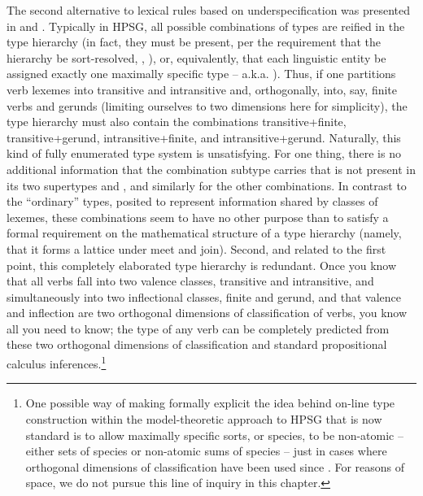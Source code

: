 \documentclass[output=paper]{langsci/langscibook}
\begin{document}
The second alternative to lexical rules based on underspecification was presented in  and . Typically in HPSG, all possible combinations of types are reified in the type hierarchy (in fact, they must be present, per the requirement that the hierarchy be sort-resolved, \citealt{Carpenter1992}, \citealt{PollardandSag1994}), or, equivalently, that each linguistic entity be assigned exactly one maximally specific type -- a.k.a.  \citet[78]{Richter2000}).
Thus, if one partitions verb lexemes into transitive and intransitive and, orthogonally, into, say, finite verbs and gerunds (limiting ourselves to two dimensions here for simplicity), the type hierarchy must also contain the combinations transitive+finite, transitive+gerund, intransitive+finite, and intransitive+gerund. Naturally, this kind of fully enumerated type system is unsatisfying. For one thing, there is no additional information that the combination subtype  carries that is not present in its two supertypes  and , and similarly for the other combinations. In contrast to the ``ordinary'' types, posited to represent information shared by classes of lexemes, these combinations seem to have no other purpose than to satisfy a formal requirement on the mathematical structure of a type hierarchy (namely, that it forms a lattice under meet and join).  Second, and related to the first point, this completely elaborated type hierarchy is redundant. Once you know that all verbs fall into two valence classes, transitive and intransitive, and simultaneously into two inflectional classes, finite and gerund, and that valence and inflection are two orthogonal dimensions of classification of verbs, you know all you need to know; the type of any verb can be completely predicted from these two orthogonal dimensions of classification and standard propositional calculus inferences.\footnote{One possible way of making formally explicit the idea behind on-line type construction within the model-theoretic approach to HPSG that is now standard \citep{King1989,Richter2000} is to allow maximally specific sorts, or species, to be non-atomic -- either sets of species or non-atomic sums of species -- just in cases where orthogonal dimensions of classification have been used since \citet{Flickinger1987}. For reasons of space, we do not pursue this line of inquiry in this chapter.}

\end{document}
